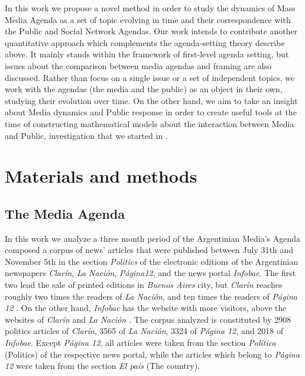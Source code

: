 \documentclass[10pt,letterpaper]{article}
\begin{document}
\par In this work we propose a novel method in order to study the dynamics of Mass Media Agenda as a set of topic evolving in time and their correspondence with the Public and Social Network Agendas.  Our work intends to contribute another quantitative approach which complements the agenda-setting theory describe above. It mainly stands within the framework of first-level agenda setting, but issues about the comparison between media agendas and framing are also discussed.
Rather than focus on a single issue or a set of independent topics, we work with the agendas (the media and the public) as an object in their own, studying their evolution over time. 
On the other hand, we aim to take an insight about Media dynamics and Public response in order to create useful tools at the time of constructing mathematical models about the interaction between Media and Public, investigation that we started in \cite{pinto2016setting}.

\section*{Materials and methods}

\subsection*{The Media Agenda}

In this work we analyze a three month period of the Argentinian Media's Agenda composed a corpus of news' articles that were published between July 31th and November 5th in the section \emph{Politics} of the electronic editions of the Argentinian newspapers \emph{Clar\'in}, \emph{La Naci\'on}, \emph{P\'agina12}, and the news portal \emph{Infobae}. The first two lead the sale of printed editions in \emph{Buenos Aires} city, but \emph{Clar\'in} reaches roughly two times the readers of \emph{La Naci\'on}, and ten times the readers of \emph{P\'agina 12} \cite{IVC}. On the other hand, \emph{Infobae} has the website with more visitors, above the websites of \emph{Clar\'in} and \emph{La Naci\'on} \cite{AlexaAR}.
The corpus analyzed is constituted by 2908 politics articles of \emph{Clar\'in}, 3565 of \emph{La Naci\'on}, 3324 of \emph{P\'agina 12}, and 2018 of \emph{Infobae}. Except \emph{P\'agina 12}, all articles were taken from the section \emph{Pol\'itica}  (Politics) of the respective news portal, while the articles which belong to \emph{P\'agina 12} were taken from the section \emph{El pa\'is} (The country).
\end{document}
